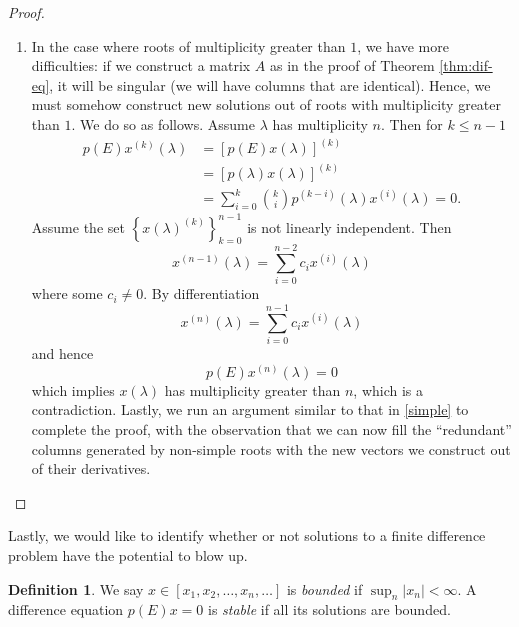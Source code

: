 \documentclass[12pt]{article}
\theoremstyle{plain}
\theoremstyle{definition}
\newtheorem*{definition}{Definition}
\theoremstyle{remark}
\numberwithin{equation}{section}  %
\begin{document}
\begin{proof}
\begin{enumerate}
\begin{equation*}
			\end{equation*}
			Observe that if we factor $\lambda_1^j$ from row $j$, for each $1 \le j
			\le m$, we obtain a Vandermonde matrix, which is invertible, by
			Lemma \ref{vander}. Hence, $A$
			is invertible, and so completely determines the $a_k$, for $1 \le k \le m$. 
			As a corollary of this argument, we obtain that the vectors $u^{(k)}$, $1 \le k
			\le m$ are linearly independent. A simple induction on $m$ completes the proof. 
		\item
			In the case where roots of multiplicity greater than $1$, we have more
			difficulties: if we construct a matrix $A$ as in the proof of
			Theorem \ref{thm:dif-eq}, it will be singular (we will have columns that are
			identical). Hence, we must somehow construct new solutions out of roots with
			multiplicity greater than $1$. We do so as
			follows. Assume $\lambda$ has multiplicity $n$. Then for $k \le n-1$
			\begin{align*}
				p(E)x^{(k)}(\lambda)
				& = [ p(E)x(\lambda) ]^{(k)} 
				\\
				& = [ p(\lambda)x(\lambda) ]^{(k)} 
				\\
				& = \sum_{i = 0}^{k} \binom{k}{i}p^{(k-i)}(\lambda) x^{(i)}(\lambda) = 0.
			\end{align*}
			Assume the set $ \left\{ x(\lambda)^{(k)} \right\}_{k=0}^{n-1} $ is not linearly
			independent.
			Then
			\begin{equation*}
				x^{(n-1)}(\lambda) = \sum_{i=0}^{n-2} c_i x^{(i)}(\lambda)
			\end{equation*}
			where some $c_i \neq 0$. By differentiation
			\begin{equation*}
				x^{(n)}(\lambda) = \sum_{i=0}^{n-1} c_i x^{(i)}(\lambda)
			\end{equation*}
			and hence
			\begin{equation*}
				p(E)x^{(n)}(\lambda) = 0
			\end{equation*}
			which implies $x(\lambda)$ has multiplicity greater than $n$, which is
			a contradiction. Lastly, we run an argument similar to that in \eqref{simple}
			to complete the proof, with the observation that we can now fill the
			``redundant'' columns generated by non-simple roots 
			with the new vectors we construct out of their derivatives.
	\end{enumerate}
\end{proof}
Lastly, we would like to identify whether or not solutions  to a finite
difference problem have the potential to blow up.
\begin{definition}
	We say $x \in [x_1, x_2, \ldots, x_n, \ldots]$ is \emph{bounded}
	if $\sup_n | x_n | < \infty$. A difference equation $p(E)x = 0$ is 
	\emph{stable} if all its solutions are bounded.
\end{definition}
\end{document}
